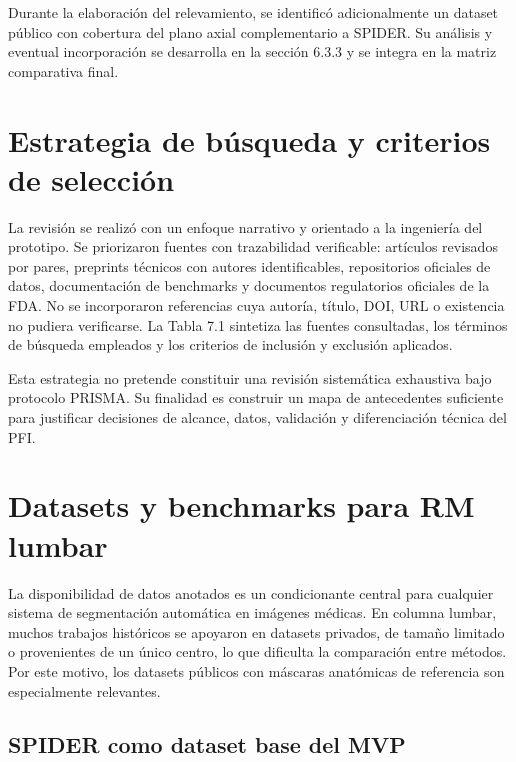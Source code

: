 Durante la elaboración del relevamiento, se identificó adicionalmente un dataset público con cobertura del plano axial complementario a SPIDER. Su análisis y eventual incorporación se desarrolla en la sección 6.3.3 y se integra en la matriz comparativa final.

\section{Estrategia de búsqueda y criterios de selección}

La revisión se realizó con un enfoque narrativo y orientado a la ingeniería del prototipo. Se priorizaron fuentes con trazabilidad verificable: artículos revisados por pares, preprints técnicos con autores identificables, repositorios oficiales de datos, documentación de benchmarks y documentos regulatorios oficiales de la FDA. No se incorporaron referencias cuya autoría, título, DOI, URL o existencia no pudiera verificarse. La Tabla 7.1 sintetiza las fuentes consultadas, los términos de búsqueda empleados y los criterios de inclusión y exclusión aplicados.


Esta estrategia no pretende constituir una revisión sistemática exhaustiva bajo protocolo PRISMA. Su finalidad es construir un mapa de antecedentes suficiente para justificar decisiones de alcance, datos, validación y diferenciación técnica del PFI.

\section{Datasets y benchmarks para RM lumbar}

La disponibilidad de datos anotados es un condicionante central para cualquier sistema de segmentación automática en imágenes médicas. En columna lumbar, muchos trabajos históricos se apoyaron en datasets privados, de tamaño limitado o provenientes de un único centro, lo que dificulta la comparación entre métodos. Por este motivo, los datasets públicos con máscaras anatómicas de referencia son especialmente relevantes.

\subsection{SPIDER como dataset base del MVP}

